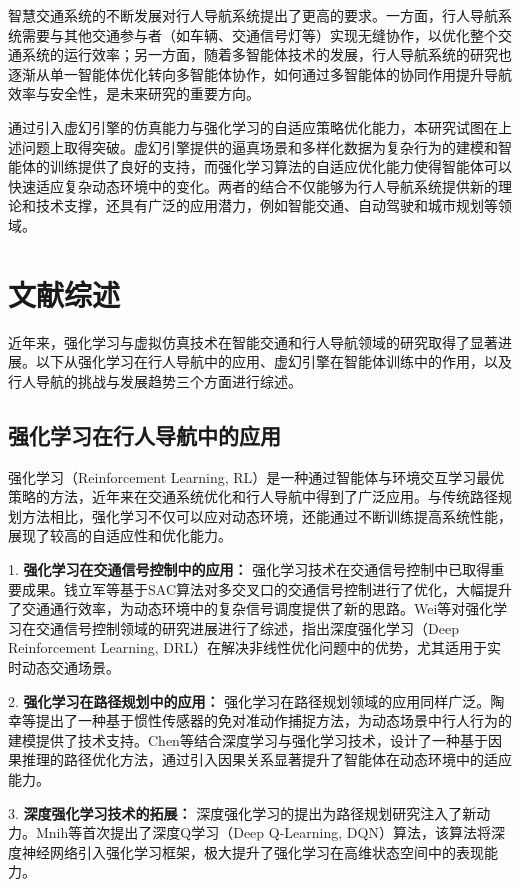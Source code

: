 智慧交通系统的不断发展对行人导航系统提出了更高的要求。一方面，行人导航系统需要与其他交通参与者（如车辆、交通信号灯等）实现无缝协作，以优化整个交通系统的运行效率；另一方面，随着多智能体技术的发展，行人导航系统的研究也逐渐从单一智能体优化转向多智能体协作，如何通过多智能体的协同作用提升导航效率与安全性，是未来研究的重要方向。

通过引入虚幻引擎的仿真能力与强化学习的自适应策略优化能力，本研究试图在上述问题上取得突破。虚幻引擎提供的逼真场景和多样化数据为复杂行为的建模和智能体的训练提供了良好的支持，而强化学习算法的自适应优化能力使得智能体可以快速适应复杂动态环境中的变化。两者的结合不仅能够为行人导航系统提供新的理论和技术支撑，还具有广泛的应用潜力，例如智能交通、自动驾驶和城市规划等领域。

\section{文献综述}

近年来，强化学习与虚拟仿真技术在智能交通和行人导航领域的研究取得了显著进展。以下从强化学习在行人导航中的应用、虚幻引擎在智能体训练中的作用，以及行人导航的挑战与发展趋势三个方面进行综述。

\subsection{强化学习在行人导航中的应用}

强化学习（Reinforcement Learning, RL）是一种通过智能体与环境交互学习最优策略的方法，近年来在交通系统优化和行人导航中得到了广泛应用。与传统路径规划方法相比，强化学习不仅可以应对动态环境，还能通过不断训练提高系统性能，展现了较高的自适应性和优化能力。

1. \textbf{强化学习在交通信号控制中的应用：} 强化学习技术在交通信号控制中已取得重要成果。钱立军等\cite{qian2024sac}基于SAC算法对多交叉口的交通信号控制进行了优化，大幅提升了交通通行效率，为动态环境中的复杂信号调度提供了新的思路。Wei等\cite{wei2021survey}对强化学习在交通信号控制领域的研究进展进行了综述，指出深度强化学习（Deep Reinforcement Learning, DRL）在解决非线性优化问题中的优势，尤其适用于实时动态交通场景。

2. \textbf{强化学习在路径规划中的应用：} 强化学习在路径规划领域的应用同样广泛。陶幸等\cite{tao2024motion}提出了一种基于惯性传感器的免对准动作捕捉方法，为动态场景中行人行为的建模提供了技术支持。Chen等\cite{chen2018ionet}结合深度学习与强化学习技术，设计了一种基于因果推理的路径优化方法，通过引入因果关系显著提升了智能体在动态环境中的适应能力。

3. \textbf{深度强化学习技术的拓展：} 深度强化学习的提出为路径规划研究注入了新动力。Mnih等\cite{mnih2013dqn}首次提出了深度Q学习（Deep Q-Learning, DQN）算法，该算法将深度神经网络引入强化学习框架，极大提升了强化学习在高维状态空间中的表现能力。

